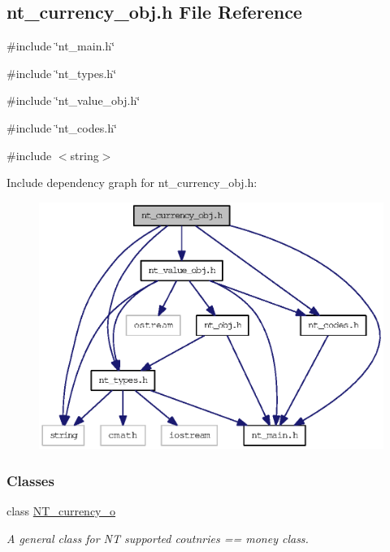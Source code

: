 \subsection{nt\_\-currency\_\-obj.h File Reference}
\label{nt__currency__obj_8h}
{\ttfamily \#include \char`\"{}nt\_\-main.h\char`\"{}}\par
{\ttfamily \#include \char`\"{}nt\_\-types.h\char`\"{}}\par
{\ttfamily \#include \char`\"{}nt\_\-value\_\-obj.h\char`\"{}}\par
{\ttfamily \#include \char`\"{}nt\_\-codes.h\char`\"{}}\par
{\ttfamily \#include $<$string$>$}\par
Include dependency graph for nt\_\-currency\_\-obj.h:
\nopagebreak
\begin{figure}[H]
\begin{center}
\leavevmode
\includegraphics[width=400pt]{nt__currency__obj_8h__incl}
\end{center}
\end{figure}
\subsubsection*{Classes}
\begin{DoxyCompactItemize}
\item 
class \hyperlink{class_n_t__currency__o}{NT\_\-currency\_\-o}
\begin{DoxyCompactList}\small\item\em A general class for NT supported coutnries == money class. \item\end{DoxyCompactList}\end{DoxyCompactItemize}
